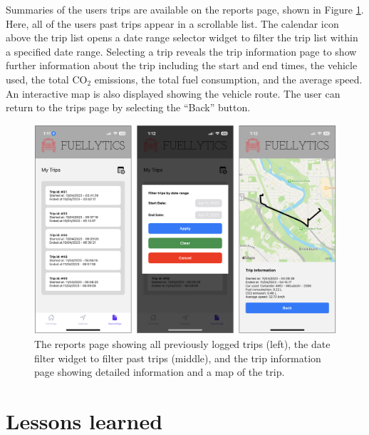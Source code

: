 \documentclass[11pt, oneside]{article}
\begin{document}
Summaries of the users trips are available on the reports page, shown in Figure \ref{fig:reports}.  Here, all of the users past trips appear in a scrollable list. The calendar icon above the trip list opens a date range selector widget to filter the trip list within a specified date range. Selecting a trip reveals the trip information page to show further information about the trip including the start and end times, the vehicle used, the total CO$_2$ emissions, the total fuel consumption, and the average speed.  An interactive map is also displayed showing the vehicle route. The user can return to the trips page by selecting the ``Back'' button.
\begin{figure}[H]
\centerline{\includegraphics[width=16.5cm]{img/reports.png}}
\caption{\label{fig:reports}The reports page showing all previously logged trips (left), the date filter widget to filter past trips (middle), and the trip information page showing detailed information and a map of the trip.}
\end{figure}

\section{Lessons learned}
\end{document}
